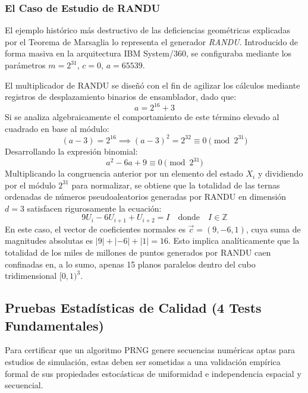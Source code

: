 \documentclass{article}
\begin{document}
\subsubsection{El Caso de Estudio de RANDU}
El ejemplo histórico más destructivo de las deficiencias geométricas explicadas por el Teorema de Marsaglia lo representa el generador \emph{RANDU}. Introducido de forma masiva en la arquitectura IBM System/360, se configuraba mediante los parámetros $m = 2^{31}$, $c=0$, $a = 65539$.

El multiplicador de RANDU se diseñó con el fin de agilizar los cálculos mediante registros de desplazamiento binarios de ensamblador, dado que:
\begin{equation}
    a = 2^{16} + 3
\end{equation}
Si se analiza algebraicamente el comportamiento de este término elevado al cuadrado en base al módulo:
\begin{equation}
    (a - 3) = 2^{16} \implies (a - 3)^2 = 2^{32} \equiv 0 \pmod{2^{31}}
\end{equation}
Desarrollando la expresión binomial:
\begin{equation}
    a^2 - 6a + 9 \equiv 0 \pmod{2^{31}}
\end{equation}
Multiplicando la congruencia anterior por un elemento del estado $X_i$ y dividiendo por el módulo $2^{31}$ para normalizar, se obtiene que la totalidad de las ternas ordenadas de números pseudoaleatorios generadas por RANDU en dimensión $d=3$ satisfacen rigurosamente la ecuación:
\begin{equation}
    9U_i - 6U_{i+1} + U_{i+2} = I \quad \text{donde} \quad I \in \mathbb{Z}
\end{equation}
En este caso, el vector de coeficientes normales es $\vec{c} = (9, -6, 1)$, cuya suma de magnitudes absolutas es $|9| + |-6| + |1| = 16$. Esto implica analíticamente que la totalidad de los miles de millones de puntos generados por RANDU caen confinadas en, a lo sumo, apenas 15 planos paralelos dentro del cubo tridimensional $[0, 1)^3$. 

\newpage

\subsection{Pruebas Estadísticas de Calidad (4 Tests Fundamentales)}
Para certificar que un algoritmo PRNG genere secuencias numéricas aptas para estudios de simulación, estas deben ser sometidas a una validación empírica formal de sus propiedades estocásticas de uniformidad e independencia espacial y secuencial.
\end{document}
